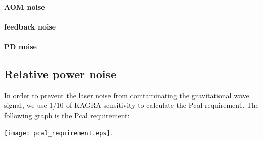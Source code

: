 \paragraph{AOM noise}
\paragraph{feedback noise}
\paragraph{PD noise}

\subsection{Relative power noise}
In order to prevent the laser noise from comtaminating the gravitational wave signal, we use 1/10 of KAGRA sensitivity to calculate the Pcal requirement. The following graph is the Pcal requirement:
\begin{center}
	\texttt{[image: pcal\_requirement.eps]}.
\end{center}

